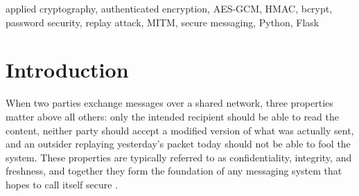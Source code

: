 \documentclass[conference]{IEEEtran}
\begin{document}
\newpage
\twocolumn

\maketitle

\begin{abstract}
Communication systems used in the real world face constant threats from passive eavesdroppers, active network intermediaries, and credential-guessing adversaries. This work presents \textit{SecureTalk}, a working web application built from the ground up to apply the standard tools of applied cryptography to a real messaging workflow. The system combines AES-256 in Galois/Counter Mode for confidential transport of every message, a separate HMAC-SHA256 layer for ciphertext integrity, bcrypt with a deliberately high work factor for password storage, and a per-message 128-bit nonce ledger for replay resistance. Encryption keys are never embedded in source code; instead they are derived at runtime from a server secret using PBKDF2-SHA256 with 100{,}000 iterations. Three categories of attack --- packet tampering by an in-path adversary, replay of captured packets, and offline guessing of user passwords --- were simulated against a live deployment of the application and were each blocked by the corresponding defensive layer. Every relevant security event is recorded both to disk and to a live in-browser log viewer, giving the operator full visibility into the system's defensive behaviour.
\end{abstract}

\begin{IEEEkeywords}
applied cryptography, authenticated encryption, AES-GCM, HMAC, bcrypt, password security, replay attack, MITM, secure messaging, Python, Flask
\end{IEEEkeywords}

\section{Introduction}

When two parties exchange messages over a shared network, three properties matter above all others: only the intended recipient should be able to read the content, neither party should accept a modified version of what was actually sent, and an outsider replaying yesterday's packet today should not be able to fool the system. These properties are typically referred to as confidentiality, integrity, and freshness, and together they form the foundation of any messaging system that hopes to call itself secure \cite{stallings2017}.
\end{document}
